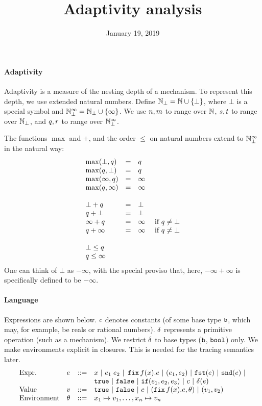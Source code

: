 \documentclass[a4paper,11pt]{article}
\title{Adaptivity analysis}
\author{}
\date{January 19, 2019}
\theoremstyle{definition}
\begin{document}
\maketitle

\paragraph{Adaptivity}
Adaptivity is a measure of the nesting depth of a mechanism. To
represent this depth, we use extended natural numbers. Define $\mathbb{N}_{\bot} =
\mathbb{N} \cup \{\bot\}$, where $\bot$ is a special symbol and $\mathbb{N}_{\bot}^\infty =
\mathbb{N}_{\bot} \cup \{\infty\}$. We use $n, m$ to range over $\mathbb{N}$,
$s, t$ to range over $\mathbb{N}_{\bot}$, and $q, r$ to
range over $\mathbb{N}_{\bot}^\infty$.

The functions $\max$ and $+$, and the order $\leq$ on natural numbers
extend to $\mathbb{N}_{\bot}^\infty$ in the natural way:
\[\begin{array}{lcl}
\max(\bot, \nnatbiA) & = & \nnatbiA \\
\max(\nnatbiA, \bot) & = & \nnatbiA \\
\max(\infty, \nnatbiA) & = & \infty \\
\max(\nnatbiA, \infty) & = & \infty \\
\\
%
\bot + \nnatbiA & = & \bot \\
\nnatbiA + \bot & = & \bot \\
\infty + \nnatbiA & = & \infty ~~~~ \mbox{if } \nnatbiA \neq \bot \\
\nnatbiA + \infty & = & \infty ~~~~ \mbox{if } \nnatbiA \neq \bot \\
\\
%
\bot \leq \nnatbiA \\
\nnatbiA \leq \infty
\end{array}
\]
One can think of $\bot$ as $-\infty$, with the special proviso that,
here, $-\infty + \infty$ is specifically defined to be $-\infty$.

\paragraph{Language}
Expressions are shown below. $c$ denotes constants (of some base
type $\mathtt{b}$, which may, for example, be reals or rational
numbers). $\delta$ represents a primitive operation (such as a
mechanism). We restrict $\delta$ to base types ($\mathtt{b}$, $\mathtt{bool}$)
only. We make environments explicit in closures. This is needed for
the tracing semantics later.
\[\begin{array}{llll}
\mbox{Expr.} & \expr & ::= & x ~|~ \expr_1 \eapp \expr_2 ~|~ \efix f(x).\expr
 ~|~ (\expr_1, \expr_2) ~|~ \eprojl(\expr) ~|~ \eprojr(\expr) ~| \\
%
& & & \etrue ~|~ \efalse ~|~ \eif(\expr_1, \expr_2, \expr_3) ~|~
\econst ~|~ \eop(\expr) \\
%
\mbox{Value} & \valr & ::= & \etrue ~|~ \efalse ~|~ \econst ~|~
(\efix f(x).\expr, \env) ~|~ (\valr_1, \valr_2) \\
%
\mbox{Environment} & \env & ::= & x_1 \mapsto \valr_1, \ldots, x_n \mapsto \valr_n
\end{array}\]
\end{document}
